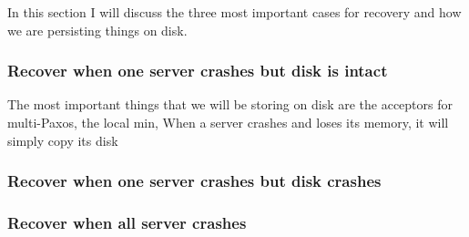 \documentclass[a4paper]{article}
\begin{document}
In this section I will discuss the three most important cases for recovery and how we are persisting things on disk.

\subsubsection{Recover when one server crashes but disk is intact}
The most important things that we will be storing on disk are the acceptors for multi-Paxos, the local min, 
When a server crashes and loses its memory, it will simply copy its disk

\subsubsection{Recover when one server crashes but disk crashes}

\subsubsection{Recover when all server crashes}
\end{document}
